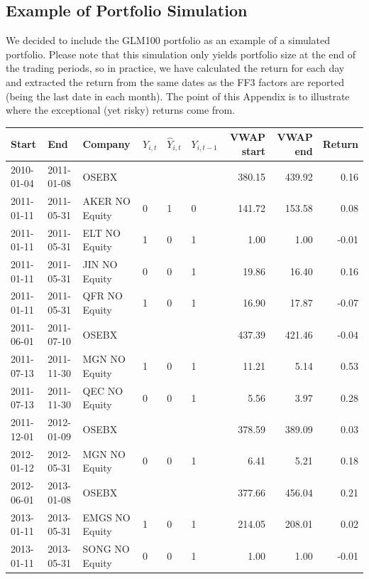 \begin{appendices}
\newpage
\section{Example of Portfolio Simulation}
\label{APPENDIX Portfolio Simulation of GLM100-portfolio}
We decided to include the GLM100 portfolio as an example of a simulated portfolio. Please note that this simulation only yields portfolio size at the end of the trading periods, so in practice, we have calculated the return for each day and extracted the return from the same dates as the FF3 factors are reported (being the last date in each month). The point of this Appendix is to illustrate where the exceptional (yet risky) returns come from. 

\begin{table}[h]
\centering
\scriptsize
\begin{tabular}{llllllrrr}
  \hline
Start & End & Company & $Y_{i,t}$ & $\widehat Y_{i,t}$ & $Y_{i,t-1}$ & VWAP start & VWAP end & Return \\ 
\hline
   2010-01-04 & 2011-01-08 & OSEBX &  &  &  & 380.15 & 439.92 & 0.16 \\ 
   2011-01-11 & 2011-05-31 & AKER NO Equity & 0 & 1 & 0 & 141.72 & 153.58 & 0.08 \\ 
   2011-01-11 & 2011-05-31 & ELT NO Equity & 1 & 0 & 1 & 1.00 & 1.00 & -0.01 \\ 
   2011-01-11 & 2011-05-31 & JIN NO Equity & 0 & 0 & 1 & 19.86 & 16.40 & 0.16 \\ 
   2011-01-11 & 2011-05-31 & QFR NO Equity & 1 & 0 & 1 & 16.90 & 17.87 & -0.07 \\ 
   2011-06-01 & 2011-07-10 & OSEBX &  &  &  & 437.39 & 421.46 & -0.04 \\ 
   2011-07-13 & 2011-11-30 & MGN NO Equity & 1 & 0 & 1 & 11.21 & 5.14 & 0.53 \\ 
   2011-07-13 & 2011-11-30 & QEC NO Equity & 0 & 0 & 1 & 5.56 & 3.97 & 0.28 \\ 
   2011-12-01 & 2012-01-09 & OSEBX &  &  &  & 378.59 & 389.09 & 0.03 \\ 
   2012-01-12 & 2012-05-31 & MGN NO Equity & 0 & 0 & 1 & 6.41 & 5.21 & 0.18 \\ 
   2012-06-01 & 2013-01-08 & OSEBX & &  &  & 377.66 & 456.04 & 0.21 \\ 
   2013-01-11 & 2013-05-31 & EMGS NO Equity & 1 & 0 & 1 & 214.05 & 208.01 & 0.02 \\ 
   2013-01-11 & 2013-05-31 & SONG NO Equity & 0 & 0 & 1 & 1.00 & 1.00 & -0.01 \\ 

\end{tabular}
\end{table}
\end{appendices}
